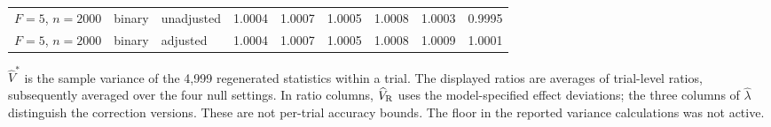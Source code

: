\documentclass[12pt,a4paper]{article}
\theoremstyle{definition}
\theoremstyle{remark}\newtheorem{remark}{Remark}
\numberwithin{equation}{section}
\begin{document}
\begin{table}[!htbp]
\begin{threeparttable}
\begin{singlespace}
\begin{tabular}{@{}lllrrrrrr@{}}
$F=5$, $n=2000$ & binary & unadjusted & 1.0004 & 1.0007 & 1.0005 & 1.0008 & 1.0003 & 0.9995\\
$F=5$, $n=2000$ & binary & adjusted & 1.0004 & 1.0007 & 1.0005 & 1.0008 & 1.0009 & 1.0001\\
\bottomrule\end{tabular}
\begin{tablenotes}[flushleft]\small\item $\widehat V^{*}$ is the sample variance of the 4,999 regenerated statistics within a trial. The displayed ratios are averages of trial-level ratios, subsequently averaged over the four null settings. In ratio columns, $\widehat V_{\rm R}$ uses the model-specified effect deviations; the three columns of $\widehat\lambda$ distinguish the correction versions. These are not per-trial accuracy bounds. The floor in the reported variance calculations was not active.\end{tablenotes}
\end{singlespace}\end{threeparttable}\end{table}
\end{document}
